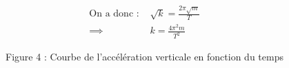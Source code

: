 \documentclass{beamer}
\begin{document}
\begin{frame}
\begin{columns}
\begin{column}{0.5\textwidth}
        \end{column}
        \begin{column}{0.5\textwidth}
            \footnotesize
            \begin{align*}
                \text{On a donc : }&\sqrt{k} = \frac{2\pi\sqrt{m}}{T} \\
                \implies &\boxed{k = \frac{4\pi^{2}m}{T^{2}}}
            \end{align*}
            \begin{figure}
                \parbox[b]{\linewidth}{\centering \tiny Figure 4 : Courbe de l'accélération verticale en fonction du temps}
            \end{figure}
        \end{column}
    \end{columns}



\end{frame}
\end{document}
